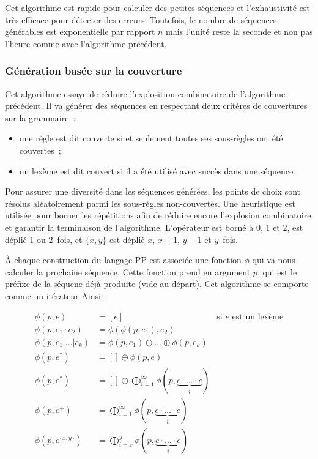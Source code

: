 Cet algorithme est rapide pour calculer des petites séquences et l'exhaustivité
est très efficace pour détecter des erreurs. Toutefois, le nombre de séquences
générables est exponentielle par rapport $n$ mais l'unité reste la seconde et
non pas l'heure comme avec l'algorithme précédent.

\subsubsection{Génération basée sur la couverture}
\label{subsection:data:coverage_based_generation}

Cet algorithme essaye de réduire l'explosition combinatoire de l'algorithme
précédent. Il va générer des séquences en respectant deux critères de
couvertures sur la grammaire~:
%
\begin{itemize}

\item une règle est dit couverte si et seulement toutes ses sous-règles ont été
couvertes~;

\item un lexème est dit couvert si il a été utilisé avec succès dans une
séquence.

\end{itemize}
%
Pour assurer une diversité dans les séquences générées, les points de choix sont
résolus aléatoirement parmi les sous-règles non-couvertes. Une heuristique est
utilisée pour borner les répétitions afin de réduire encore l'explosion
combinatoire et garantir la terminaison de l'algorithme. L'opérateur \code{*}
est borné à 0, 1 et 2, \code{+} est déplié 1 ou 2~fois, et $\{x, y\}$ est
déplié $x$, $x + 1$, $y - 1$ et $y$~fois.

À chaque construction du langage PP est associée une fonction $\phi$ qui va nous
calculer la prochaine séquence. Cette fonction prend en argument $p$, qui est le
préfixe de la séquene déjà produite (vide au départ). Cet algorithme se comporte
comme un itérateur Ainsi~:

\begin{align*}
%
\phi(p, e) & =
    [e]
    &
    \text{si $e$ est un lexème}
    \\
%
\phi(p, e_1 \cdot e_2) & =
    \phi(\phi(p, e_1), e_2)
    \\
%
\phi(p, e_1 \vert \dotso \vert e_k) & =
    \phi(p, e_1) \oplus \dotso \oplus \phi(p, e_k)
    \\
%
\phi(p, e^?) & =
    [] \oplus \phi(p, e)
    \\
%
\phi(p, e^*) & =
    [] \oplus \bigoplus_{i = 1}^\infty
    \phi(p, \underbrace{e \cdot \dotso \cdot e}_i)
    \\
%
\phi(p, e^+) & =
    \bigoplus_{i = 1}^\infty \phi(p, \underbrace{e \cdot \dotso \cdot e}_i)
    \\
%
\phi(p, e^{\{x, y\}}) & =
    \bigoplus_{i = x}^y \phi(p, \underbrace{e \cdot \dotso \cdot e}_i)
%
\end{align*}

